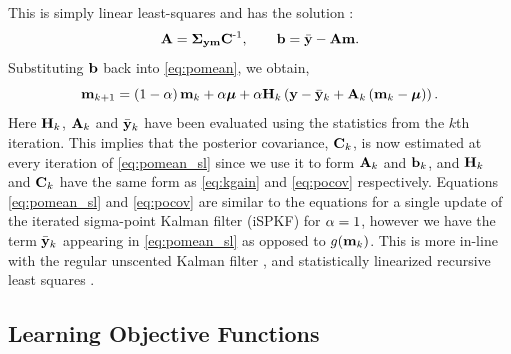 \documentclass{article} %
\begin{document}
This is simply linear least-squares and has the solution \cite{Geist2010}:
\begin{equation}
    \mathbf{A} = \boldsymbol\Sigma_{\mathbf{y}\mathbf{m}} \mathbf{C}^{\text{-}1}, \qquad
    \mathbf{b} = \bar{\mathbf{y}} - \mathbf{A}\mathbf{m}.
\end{equation}
Substituting $\mathbf{b}$ back into \eqref{eq:pomean}, we obtain, 
\begin{equation}
    \mathbf{m}_{k+1} = \left({1-\alpha}\right)\mathbf{m}_k + \alpha\boldsymbol{\mu} 
        + \alpha\mathbf{H}_k\left({\mathbf{y} - \bar{\mathbf{y}}_k 
        + \mathbf{A}_k\left({\mathbf{m}_k - \boldsymbol{\mu}}\right)}\right).
    \label{eq:pomean_sl}
\end{equation}
Here $\mathbf{H}_k$, $\mathbf{A}_k$ and $\bar{\mathbf{y}}_k$ have been evaluated using the
statistics from the $k$th iteration. This implies that the posterior
covariance, $\mathbf{C}_k$, is now estimated at every iteration of
\eqref{eq:pomean_sl} since we use it to form $\mathbf{A}_k$ and $\mathbf{b}_k$, and 
$\mathbf{H}_k$ and $\mathbf{C}_k$ have the same form as \eqref{eq:kgain} and
\eqref{eq:pocov} respectively. Equations \eqref{eq:pomean_sl} and
\eqref{eq:pocov} are similar to the equations for a single update of the
iterated sigma-point Kalman filter (iSPKF) \cite{Sibley2006} for $\alpha = 1$,
however we have the term $\bar{\mathbf{y}}_k$ appearing in \eqref{eq:pomean_sl} as
opposed to $g\!\left({{\mathbf{m}_k}}\right)$. This is more in-line with the regular
unscented Kalman filter \cite{Julier2004}, and statistically linearized
recursive least squares \cite{Geist2010}.


\subsection{Learning Objective Functions}
\end{document}
